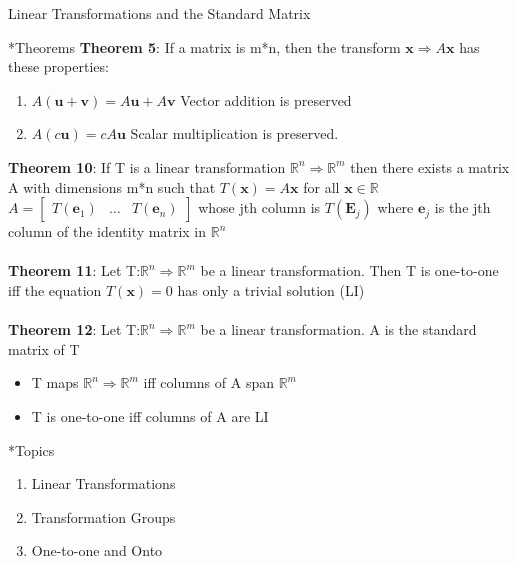\documentclass[a4paper, 12pt]{article}
\begin{document}
\begin{section}{Linear Transformations and the Standard Matrix}
\begin{subsection}*{Theorems}
\textbf{Theorem 5}: If a matrix is m*n, then the transform 
$\textbf{x} \Rightarrow A\textbf{x}$ has these properties:
\begin{enumerate}
\item{$A(\textbf{u}+\textbf{v})=A\textbf{u}+A\textbf{v}$
Vector addition is preserved}
\item{$A(c\textbf{u})=cA\textbf{u}$} Scalar multiplication
	is preserved.
\end{enumerate}
\textbf{Theorem 10}: If T is a linear transformation
$\mathbb{R}^n \Rightarrow \mathbb{R}^m$ then there exists a matrix
A with dimensions m*n such that $T(\textbf{x})=A\textbf{x}$ for
all $\textbf{x}\in\mathbb{R}$ 
\\
$A= \begin{bmatrix} T(\textbf{e}_1) & \dots & T(\textbf{e}_n) 
\end{bmatrix}$ whose jth column is $T(\textbf{E}_j)$ where 
$\textbf{e}_j$ is the jth column of the identity matrix in 
$\mathbb{R}^n$
\\
\\ \textbf{Theorem 11}: Let T:$\mathbb{R}^n\Rightarrow\mathbb{R}^m$
be a linear transformation. Then T is one-to-one iff the equation $T(\textbf{x})=0$ has only
a trivial solution (LI)
\\
\\ \textbf{Theorem 12}:
Let T:$\mathbb{R}^n\Rightarrow\mathbb{R}^m$
be a linear transformation. A is the standard matrix of T
\begin{itemize}
\item{T maps $\mathbb{R}^n\Rightarrow\mathbb{R}^m$ iff columns of
	A span $\mathbb{R}^m$}
\item{T is one-to-one iff columns of A are LI}
\end{itemize}
\end{subsection}
	
\begin{subsection}*{Topics}
\begin{enumerate}
\item{Linear Transformations}
\item{Transformation Groups}
\item{One-to-one and Onto}
\end{enumerate}
\end{subsection}


\end{section}
\end{document}
